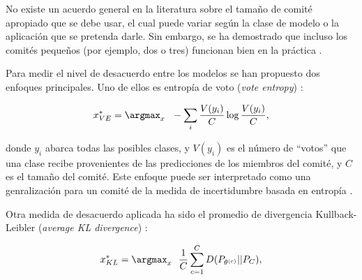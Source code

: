 No existe un acuerdo general en la literatura sobre el tamaño de comité apropiado que se debe usar, el cual puede variar según la clase de modelo o la aplicación que se pretenda darle. Sin embargo, se ha demostrado que incluso los comités pequeños (por ejemplo, dos o tres) funcionan bien en la práctica \cite{mccallum1998employing, settles2008analysis}. 




Para medir el nivel de desacuerdo entre los modelos se han propuesto dos enfoques principales. Uno de ellos es entropía de voto (\textit{vote entropy}) \cite{dagan1995committee}:

\begin{equation}
x_{VE}^* =  \argmax_x \ \ - \sum_i { \frac{V(y_i)}{C} \log{\frac{V(y_i)}{C}}},
\end{equation}

donde $y_i$ abarca todas las posibles clases, y $V(y_i)$ es el número de “votos” que una clase recibe provenientes de las predicciones de los miembros del comité, y $C$ es el tamaño del comité. Este enfoque puede ser interpretado como una genralización para un comité de la medida de incertidumbre basada en entropía \cite{settles2009survey}.

Otra medida de desacuerdo aplicada ha sido el promedio de divergencia Kullback-Leibler (\textit{average KL divergence}) \cite{mccallum1998employing}:

\begin{equation}
x_{KL}^* =  \argmax_x \ \ \frac{1}{C} \sum_{c=1}^{C} D(P_{\theta^{(c)}}|| P_C),
\end{equation}

